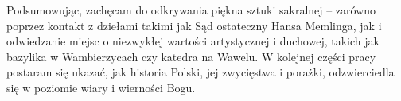 Podsumowując, zachęcam do odkrywania piękna sztuki sakralnej – zarówno
poprzez kontakt z dziełami takimi jak Sąd ostateczny Hansa Memlinga, jak i odwiedzanie
miejsc o niezwykłej wartości artystycznej i duchowej, takich jak bazylika w Wambierzycach
czy katedra na Wawelu. W kolejnej części pracy postaram się ukazać, jak historia Polski,
jej zwycięstwa i porażki, odzwierciedla się w poziomie wiary i wierności Bogu.

